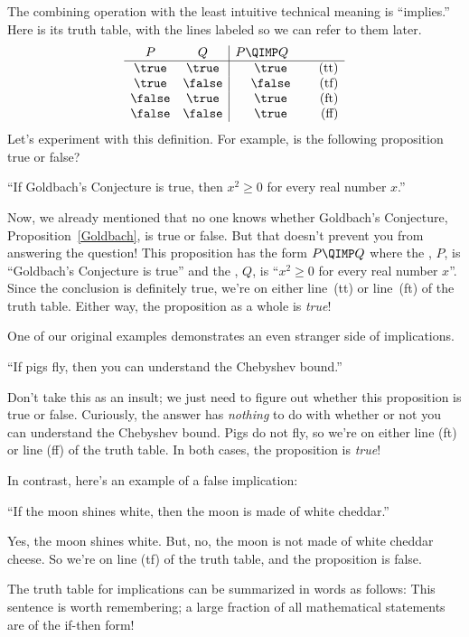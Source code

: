 The combining operation with the least intuitive technical meaning is
``implies.''  Here is its truth table, with the lines labeled so we can
refer to them later.
%
\[
\begin{array}{cc|cr}
    P  &   Q    & \parbox[b]{13ex}{$P \QIMP Q$} \\ \hline
\true  & \true  & \true & \text{(tt)}\\
\true  & \false & \false  & \text{(tf)}\\
\false & \true  & \true  & \text{(ft)}\\
\false & \false & \true  & \text{(ff)}
\end{array}
\]
Let's experiment with this definition.  For example, is the following
proposition true or false?
%
\begin{center}
``If Goldbach's Conjecture is true, then $x^2 \geq 0$ for every real
number $x$.''
\end{center}
%
Now, we already mentioned that no one knows whether Goldbach's Conjecture,
Proposition~\ref{Goldbach}, is true or false.  But that doesn't prevent
you from answering the question!  This proposition has the form $P
\QIMP Q$ where the , $P$, is ``Goldbach's Conjecture
is true'' and the , $Q$, is ``$x^2 \geq 0$ for every real
number $x$''.  Since the conclusion is definitely true, we're on either
line~(tt) or line~(ft) of the truth table.  Either way, the proposition as
a whole is \textit{true}!

One of our original examples demonstrates an even stranger side of
implications.
\begin{center}
``If pigs fly, then you can understand the Chebyshev bound.''
\end{center}
Don't take this as an insult; we just need to figure out whether this
proposition is true or false.  Curiously, the answer has \textit{nothing}
to do with whether or not you can understand the Chebyshev bound.  Pigs do
not fly, so we're on either line (ft) or line (ff) of the truth table.  In
both cases, the proposition is \textit{true}!

In contrast, here's an example of a false implication:
%
\begin{center}
``If the moon shines white, then the moon is made of white cheddar.''
\end{center}
%
Yes, the moon shines white.  But, no, the moon is not made of white
cheddar cheese.  So we're on line (tf) of the truth table, and the
proposition is false.

The truth table for implications can be summarized in words as
follows:
%
%
This sentence is worth remembering; a large fraction of all
mathematical statements are of the if-then form!

